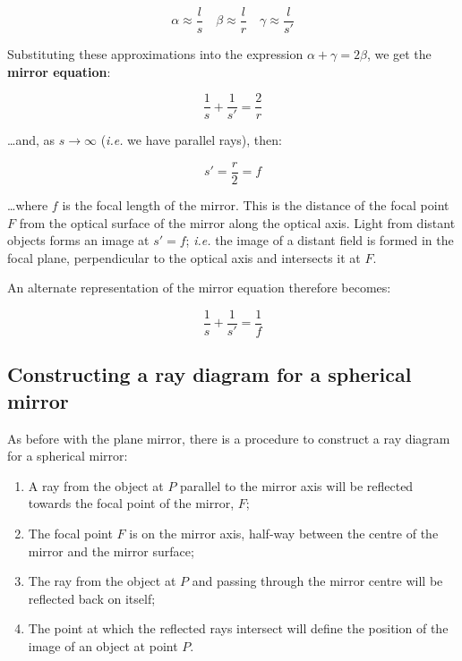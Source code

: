 \documentclass[
]{book}
\providecommand{\tightlist}{%
  \setlength{\itemsep}{0pt}\setlength{\parskip}{0pt}}
\begin{document}
\begin{equation}
\alpha \approx \frac{l}{s} \quad \beta \approx \frac{l}{r} \quad \gamma \approx \frac{l}{s'}
\end{equation}

Substituting these approximations into the expression \(\alpha + \gamma = 2\beta\), we get the \textbf{mirror equation}:

\begin{equation}
\frac{1}{s} + \frac{1}{s'} = \frac{2}{r}
\end{equation}

\ldots and, as \(s \rightarrow \infty\) (\emph{i.e.} we have parallel rays), then:

\begin{equation}
s' = \frac{r}{2} = f
\end{equation}

\ldots where \(f\) is the focal length of the mirror. This is the distance of the focal point \(F\) from the optical surface of the mirror along the optical axis. Light from distant objects forms an image at \(s' = f\); \emph{i.e.} the image of a distant field is formed in the focal plane, perpendicular to the optical axis and intersects it at \(F\).

An alternate representation of the mirror equation therefore becomes:

\begin{equation}
\frac{1}{s} + \frac{1}{s'} = \frac{1}{f}
\label{eq:ch15-mirrorequation1}
\end{equation}

\hypertarget{sec-ch15-raydiagramconcavesphericalmirror}{%
\subsection{Constructing a ray diagram for a spherical mirror}\label{sec-ch15-raydiagramconcavesphericalmirror}}

As before with the plane mirror, there is a procedure to construct a ray diagram for a spherical mirror:

\begin{enumerate}
\def\labelenumi{\arabic{enumi}.}
\tightlist
\item
  A ray from the object at \(P\) parallel to the mirror axis will be reflected towards the focal point of the mirror, \(F\);
\item
  The focal point \(F\) is on the mirror axis, half-way between the centre of the mirror and the mirror surface;
\item
  The ray from the object at \(P\) and passing through the mirror centre will be reflected back on itself;
\item
  The point at which the reflected rays intersect will define the position of the image of an object at point \(P\).
\end{enumerate}
\end{document}
